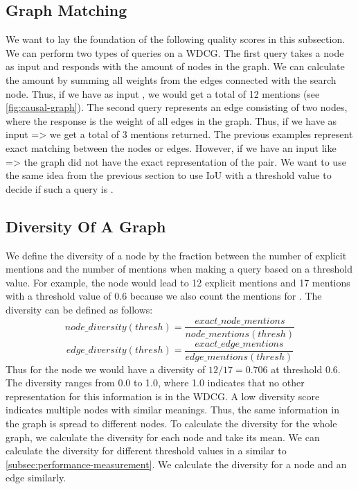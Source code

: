 \subsection{Graph Matching}\label{subsec:graph-matching}
We want to lay the foundation of the following quality scores in this subsection.
We can perform two types of queries on a \ac{WDCG}.
The first query takes a node as input and responds with the amount of  nodes in the graph.
We can calculate the amount by summing all weights from the edges connected with the search node.
Thus, if we have as input , we would get a total of 12 mentions (see \autoref{fig:causal-graph}).
The second query represents an edge consisting of two nodes, where the response is the weight of all  edges in the graph.
Thus, if we have as input  => we get a total of 3 mentions returned.
The previous examples represent exact matching between the nodes or edges.
However, if we have an input like  =>  the graph did not have the exact representation of the pair.
We want to use the same idea from the previous section to use \ac{IoU} with a threshold value to decide if such a query is .

\subsection{Diversity Of A Graph}\label{subsec:diversity-of-graph}
We define the diversity of a node by the fraction between the number of explicit mentions and the number of mentions when making a query based on a threshold value.
For example, the node  would lead to 12 explicit mentions and 17 mentions with a threshold value of 0.6 because we also count the mentions for .
The diversity can be defined as follows:
\begin{equation}
    \label{eq:node-diversity}
    node\_diversity(thresh) = \frac{exact\_node\_mentions}{node\_mentions(thresh)}
\end{equation}
\begin{equation}
    \label{eq:edge-diversity}
    edge\_diversity(thresh) = \frac{exact\_edge\_mentions}{edge\_mentions(thresh)}
\end{equation}
Thus for the node  we would have a diversity of $12/17=0.706$ at threshold 0.6.
The diversity ranges from 0.0 to 1.0, where 1.0 indicates that no other representation for this information is in the \ac{WDCG}.
A low diversity score indicates multiple nodes with similar meanings.
Thus, the same information in the graph is spread to different nodes.
To calculate the diversity for the whole graph, we calculate the diversity for each node and take its mean.
We can calculate the diversity for different threshold values in a similar to \autoref{subsec:performance-measurement}.
We calculate the diversity for a node and an edge similarly.


